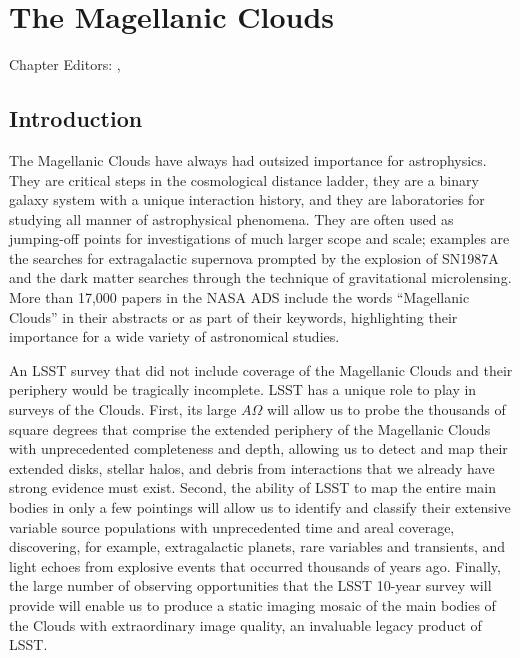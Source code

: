 
\chapter{The Magellanic Clouds}
\def\chpname{MCs}\label{chp:\chpname}

Chapter Editors:
,

%

\section{Introduction}

The Magellanic Clouds have always had outsized importance for
astrophysics.  They are critical steps in the cosmological distance
ladder, they are a binary galaxy system with a unique interaction
history, and they are laboratories for studying all manner of
astrophysical phenomena.  They are often used as jumping-off points
for investigations of much larger scope and scale; examples are the
searches for extragalactic supernova prompted by the explosion of
SN1987A and the dark matter searches through the technique of
gravitational microlensing.  More than 17,000 papers in the NASA ADS
include the words ``Magellanic Clouds'' in their abstracts or as part
of their keywords, highlighting their importance for a wide variety of
astronomical studies.


An LSST survey that did not include coverage of the Magellanic Clouds
and their periphery would be tragically incomplete.  LSST has a unique
role to play in surveys of the Clouds.  First, its large $A\Omega$
will allow us to probe the thousands of square degrees that comprise
the extended periphery of the Magellanic Clouds with unprecedented
completeness and depth, allowing us to detect and map their extended
disks, stellar halos, and debris from interactions that we already
have strong evidence must exist.  Second, the ability of LSST
to map the entire main bodies in only a few pointings will allow us to
identify and classify their extensive variable source populations with
unprecedented time and areal coverage, discovering, for example,
extragalactic planets, rare variables and transients, and light echoes
from explosive events that occurred thousands of years ago.
Finally, the large number of observing opportunities that the LSST
10-year survey will provide will enable us to produce a static imaging
mosaic of the main bodies of the Clouds with extraordinary image
quality, an invaluable legacy product of LSST.

